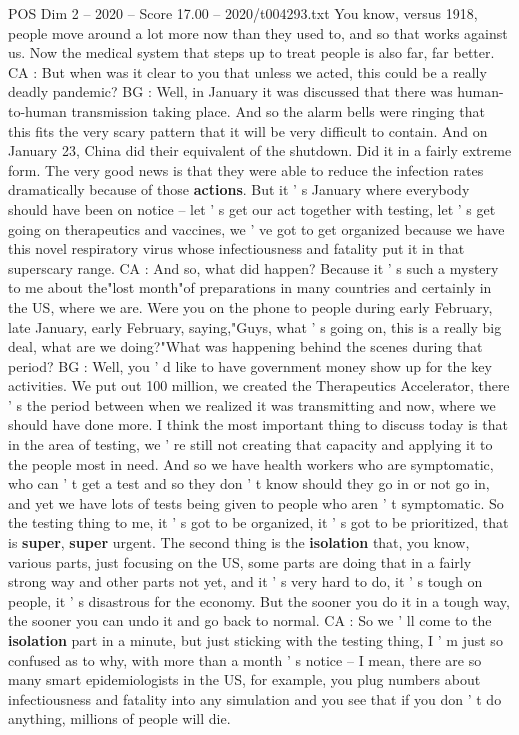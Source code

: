 \begin{textsample}{POS Dim 2 – 2020 – Score 17.00 – 2020/t004293.txt}
You know, versus 1918, people move around a lot more now than they used to, and so that works against us.
Now the medical system that steps up to treat people is also far, far better.
CA : But when was it clear to you that unless we acted, this could be a really deadly pandemic?
BG : Well, in January it was discussed that there was human-to-human transmission taking place.
And so the alarm bells were ringing that this fits the very scary pattern that it will be very difficult to contain.
And on January 23, China did their equivalent of the shutdown.
Did it in a fairly extreme form.
The very good news is that they were able to reduce the infection rates dramatically because of those \textbf{actions}.
But it ' s January where everybody should have been on notice -- let ' s get our act together with testing, let ' s get going on therapeutics and vaccines, we ' ve got to get organized because we have this novel respiratory virus whose infectiousness and fatality put it in that superscary range.
CA : And so, what did happen?
Because it ' s such a mystery to me about the"lost month"of preparations in many countries and certainly in the US, where we are.
Were you on the phone to people during early February, late January, early February, saying,"Guys, what ' s going on, this is a really big deal, what are we doing?"What was happening behind the scenes during that period?
BG : Well, you ' d like to have government money show up for the key activities.
We put out 100 million, we created the Therapeutics Accelerator, there ' s the period between when we realized it was transmitting and now, where we should have done more.
I think the most important thing to discuss today is that in the area of testing, we ' re still not creating that capacity and applying it to the people most in need.
And so we have health workers who are symptomatic, who can ' t get a test and so they don ' t know should they go in or not go in, and yet we have lots of tests being given to people who aren ' t symptomatic.
So the testing thing to me, it ' s got to be organized, it ' s got to be prioritized, that is \textbf{super}, \textbf{super} urgent.
The second thing is the \textbf{isolation} that, you know, various parts, just focusing on the US, some parts are doing that in a fairly strong way and other parts not yet, and it ' s very hard to do, it ' s tough on people, it ' s disastrous for the economy.
But the sooner you do it in a tough way, the sooner you can undo it and go back to normal.
CA : So we ' ll come to the \textbf{isolation} part in a minute, but just sticking with the testing thing, I ' m just so confused as to why, with more than a month ' s notice -- I mean, there are so many smart epidemiologists in the US, for example, you plug numbers about infectiousness and fatality into any simulation and you see that if you don ' t do anything, millions of people will die.

\end{textsample}
